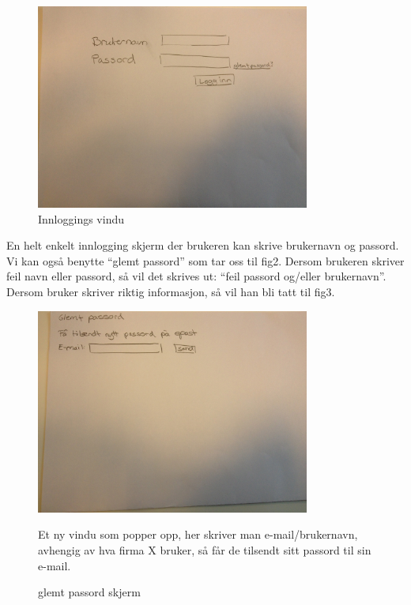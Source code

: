 \begin{figure}[ht!]
\includegraphics[width=90mm]{fig1.jpg}
\caption{Innloggings vindu}
\label{fig1}
\end{figure}
En helt enkelt innlogging skjerm der brukeren kan skrive brukernavn og passord. Vi kan også benytte “glemt passord” som tar oss til fig2. Dersom brukeren skriver feil navn eller passord, så vil det skrives ut: “feil passord og/eller brukernavn”. Dersom bruker skriver riktig informasjon, så vil han bli tatt til fig3.
\newpage

\begin{figure}[ht!]
\includegraphics[width=90mm]{fig2.jpg}
\caption{glemt passord skjerm}
Et ny vindu som popper opp, her skriver man e-mail/brukernavn, avhengig av hva firma X bruker, så får de tilsendt sitt passord til sin e-mail.
\end{figure}

\newpage

